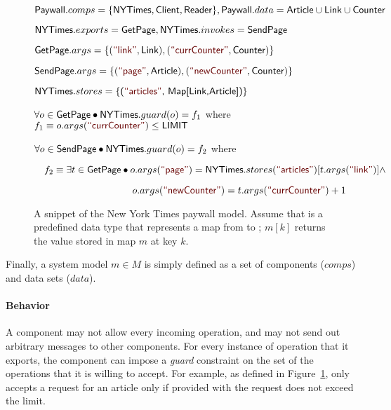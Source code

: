 \begin{figure}[!t]
{\begin{minipage}[t]{0.97\textwidth}
$\textsf{Paywall}.comps = \{\textsf{NYTimes}, \textsf{Client},
\textsf{Reader}\}, \textsf{Paywall}.data = \textsf{Article} \cup \textsf{Link} \cup
\textsf{Counter}$ 


$\textsf{NYTimes}.exports = \textsf{GetPage}, \textsf{NYTimes}.invokes = \textsf{SendPage}$

$\cname{GetPage}.args =
\{(\strlit{link}, \cname{Link}),(\strlit{currCounter}, \cname{Counter})\}$

$\cname{SendPage}.args =
\{(\strlit{page}, \cname{Article}),(\strlit{newCounter}, \cname{Counter})\}$

$\cname{NYTimes}.stores =
\{\cname{(\strlit{articles}, \cname{Map[Link,Article]})}\}$ 


$\forall o \in \textsf{GetPage} \bullet \textsf{NYTimes}.guard(o) = f_1 $
where $f_1 \equiv o.args(\strlit{currCounter}) \leq \cname{LIMIT}$

$\forall o \in \textsf{SendPage} \bullet \textsf{NYTimes}.guard(o) = f_2
$ where

$\quad f_2 \equiv \exists t \in \cname{GetPage} \bullet o.args(\strlit{page}) =
\cname{NYTimes}.stores(\strlit{articles})[t.args(\strlit{link})]
\land$ 

$\quad\quad\quad\quad\quad\quad\quad\quad\quad\quad o.args(\strlit{newCounter}) = t.args(\strlit{currCounter}) + 1$
\end{minipage}
}
\caption{A snippet of the New York Times paywall model. Assume that
   is a predefined data type that represents a map
  from  to ; $m[k]$ returns the value stored in
  map $m$ at key $k$.}
\label{fig-nytimes-spec}
\end{figure}

Finally, a system model $m \in M$ is
simply defined as a set of components ($comps$) and data sets
($data$). 

\paragraph{\textbf{Behavior}} A component may not allow every incoming
operation, and may not send out arbitrary messages to other
components. For every instance of operation that it exports, the
component can impose a \textit{guard} constraint on the set of the
operations that it is willing to accept. For example, as defined in
Figure~\ref{fig-nytimes-spec},  only accepts a request
for an article only if  provided with the request
does not exceed the limit.

